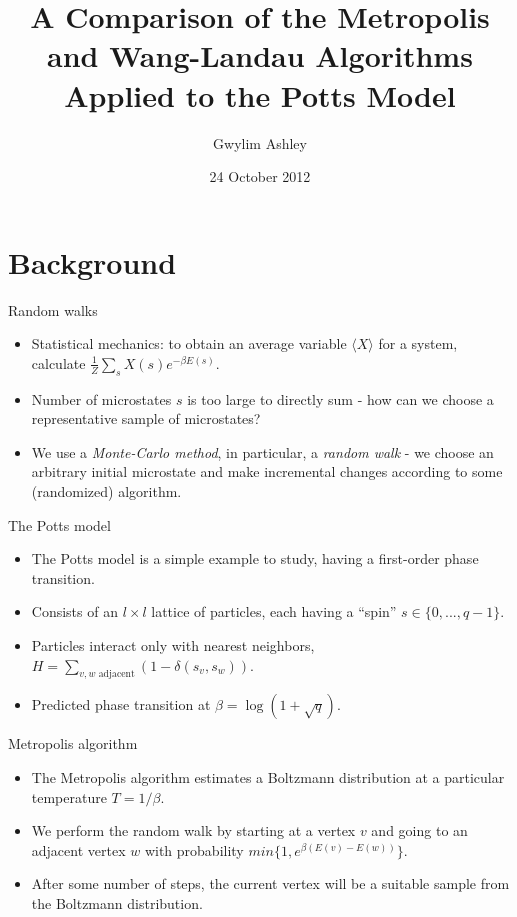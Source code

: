 \documentclass{beamer}
\title[Metropolis and Wang-Landau algorithms]{A Comparison of the Metropolis and Wang-Landau Algorithms Applied to the Potts Model}
\author{Gwylim Ashley}
\date{24 October 2012}
\begin{document}
\begin{frame}
  \titlepage
\end{frame}

\section{Background}
\begin{frame}{Random walks}
    \begin{itemize}
        \item Statistical mechanics: to obtain an average variable $\langle X\rangle$ for a system, calculate $\frac{1}{Z}\sum_s X(s)e^{-\beta E(s)}$.
        \item Number of microstates $s$ is too large to directly sum - how can we choose a representative sample of microstates?
        \item We use a \emph{Monte-Carlo method}, in particular, a \emph{random walk} - we choose an arbitrary initial microstate and make incremental changes according to some (randomized) algorithm.
    \end{itemize}
\end{frame}
\begin{frame}{The Potts model}
    \begin{itemize}
        \item The Potts model is a simple example to study, having a first-order phase transition.
        \item Consists of an $l\times l$ lattice of particles, each having a ``spin'' $s \in \{0,...,q-1\}$.
        \item Particles interact only with nearest neighbors, $H = \sum_{v, w\text{ adjacent}}(1 - \delta(s_v, s_w))$.
        \item Predicted phase transition at $\beta = \log(1 + \sqrt q)$.
    \end{itemize}
\end{frame}
\begin{frame}{Metropolis algorithm}
    \begin{itemize}
        \item The Metropolis algorithm estimates a Boltzmann distribution at a particular temperature $T = 1/\beta$.
        \item We perform the random walk by starting at a vertex $v$ and going to an adjacent vertex $w$ with probability $min\{1, e^{\beta(E(v) - E(w))}\}$.
        \item After some number of steps, the current vertex will be a suitable sample from the Boltzmann distribution.
    \end{itemize}
\end{frame}
\end{document}
